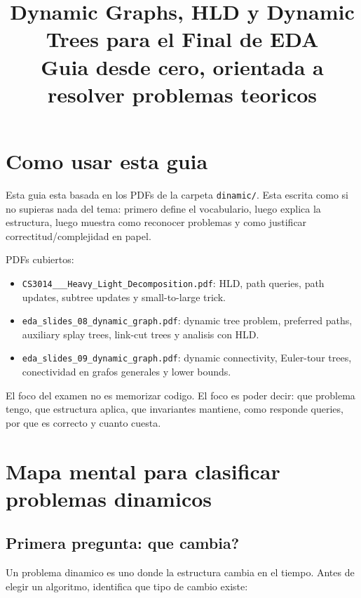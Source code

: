\documentclass[10pt]{article}
\title{Dynamic Graphs, HLD y Dynamic Trees para el Final de EDA\\
\large Guia desde cero, orientada a resolver problemas teoricos}
\author{}
\date{}
\begin{document}
\sloppy
\maketitle

\section*{Como usar esta guia}
Esta guia esta basada en los PDFs de la carpeta \texttt{dinamic/}. Esta escrita
como si no supieras nada del tema: primero define el vocabulario, luego explica
la estructura, luego muestra como reconocer problemas y como justificar
correctitud/complejidad en papel.

PDFs cubiertos:
\begin{itemize}[leftmargin=*]
\item \texttt{CS3014\_\_\_Heavy\_Light\_Decomposition.pdf}: HLD, path queries,
path updates, subtree updates y small-to-large trick.
\item \texttt{eda\_slides\_08\_dynamic\_graph.pdf}: dynamic tree problem,
preferred paths, auxiliary splay trees, link-cut trees y analisis con HLD.
\item \texttt{eda\_slides\_09\_dynamic\_graph.pdf}: dynamic connectivity,
Euler-tour trees, conectividad en grafos generales y lower bounds.
\end{itemize}

El foco del examen no es memorizar codigo. El foco es poder decir: que problema
tengo, que estructura aplica, que invariantes mantiene, como responde queries,
por que es correcto y cuanto cuesta.

\tableofcontents
\newpage

\section{Mapa mental para clasificar problemas dinamicos}

\subsection{Primera pregunta: que cambia?}
Un problema dinamico es uno donde la estructura cambia en el tiempo. Antes de
elegir un algoritmo, identifica que tipo de cambio existe:
\end{document}
